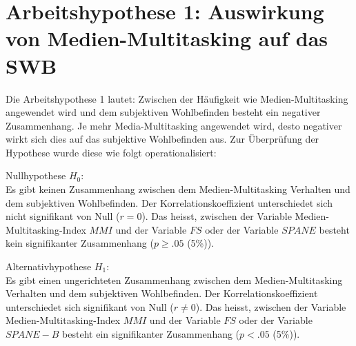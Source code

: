 \section{Arbeitshypothese 1: Auswirkung von Medien-Multitasking auf das SWB}\label{label.ergebnisse.arbeitshypothese1}
Die Arbeitshypothese 1 lautet: Zwischen der Häufigkeit wie Medien-Multitasking angewendet wird und dem subjektiven Wohlbefinden besteht ein negativer Zusammenhang. Je mehr Media-Multitasking angewendet wird, desto negativer wirkt sich dies auf das subjektive Wohlbefinden aus. Zur Überprüfung der Hypothese wurde diese wie folgt operationalisiert:\par
Nullhypothese $H_{0}$:\\
Es gibt keinen Zusammenhang zwischen dem Medien-Multitasking Verhalten und dem subjektiven Wohlbefinden. Der Korrelationskoeffizient unterschiedet sich nicht signifikant von Null ($r=0$). Das heisst, zwischen der Variable Medien-Multitasking-Index $MMI$ und der Variable $FS$ oder der Variable $SPANE$  besteht kein signifikanter Zusammenhang ($p \geq .05$ (5\%)).
\par
Alternativhypothese $H_{1}$:\\
Es gibt einen ungerichteten Zusammenhang zwischen dem Medien-Multitasking Verhalten und dem subjektiven Wohlbefinden. Der Korrelationskoeffizient unterschiedet sich signifikant von Null ($r \neq 0$). Das heisst, zwischen der Variable Medien-Multitasking-Index $MMI$ und der Variable $FS$ oder der Variable $SPANE-B$ besteht ein signifikanter Zusammenhang ($p < .05$ (5\%)).
